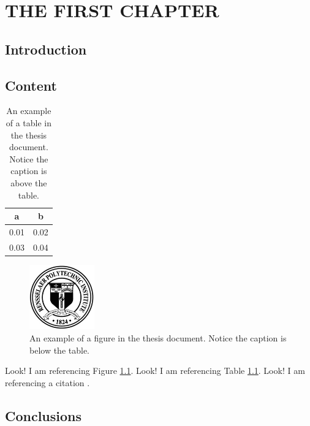 \chapter{THE FIRST CHAPTER}
\label{chap:chapterone}

\let\thefootnote\relax{}

\section{Introduction}

\blindtext

\section{Content}

\blindtext

\begin{table}[hbt!]
\centering
\begin{tabular}{|c | c |}
\hline
a & b \\ \hline\hline
0.01 & 0.02 \\ \hline
0.03 & 0.04 \\ \hline
\end{tabular}
\caption{An example of a table in the thesis document.
Notice the caption is above the table.}
\label{table:mytable}
\end{table}

\blindtext

\begin{figure}[ht!]
\centering
\includegraphics[width=0.25\textwidth]{rpi_seal}
\caption{An example of a figure in the thesis document.
Notice the caption is below the table.}
\label{fig:myfigure}
\end{figure}

Look! I am referencing Figure \ref{fig:myfigure}.
Look! I am referencing Table \ref{table:mytable}.
Look! I am referencing a citation \cite{areference}.

\section{Conclusions}

\blindtext
